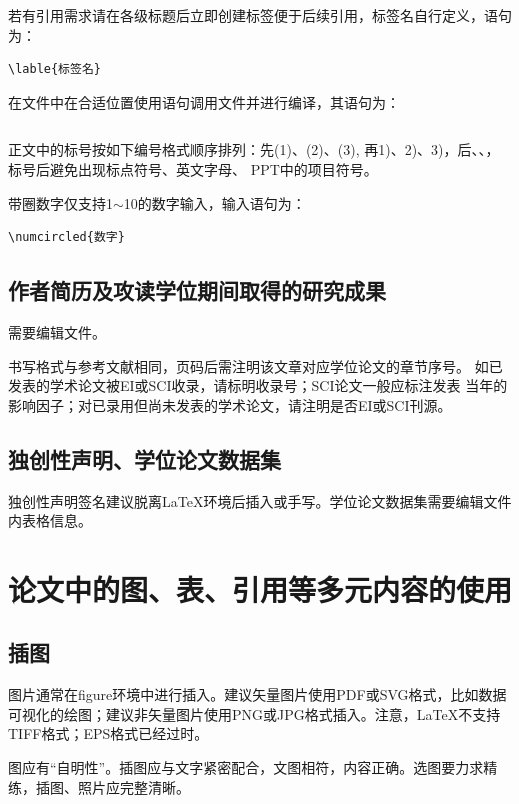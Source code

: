 若有引用需求请在各级标题后立即创建标签便于后续引用，标签名自行定义，语句为：
\begin{lstlisting}[language={[LaTeX]TeX}]
\lable{标签名}
\end{lstlisting}


在文件中在合适位置使用语句调用文件并进行编译，其语句为：
\begin{lstlisting}[language={[LaTeX]TeX}]

\end{lstlisting}

正文中的标号按如下编号格式顺序排列：先(1)、(2)、(3), 再1)、2)、3)，后、、，标号后避免出现标点符号、英文字母、 PPT中的项目符号。

带圈数字仅支持1$\sim$10的数字输入，输入语句为：
\begin{lstlisting}[language={[LaTeX]TeX}]
\numcircled{数字}
\end{lstlisting}

\subsection{作者简历及攻读学位期间取得的研究成果}
需要编辑文件。

书写格式与参考文献相同，页码后需注明该文章对应学位论文的章节序号。
如已发表的学术论文被EI或SCI收录，请标明收录号；SCI论文一般应标注发表
当年的影响因子；对已录用但尚未发表的学术论文，请注明是否EI或SCI刊源。

\subsection{独创性声明、学位论文数据集}
独创性声明签名建议脱离\LaTeX{}环境后插入或手写。学位论文数据集需要编辑文件内表格信息。

\section{论文中的图、表、引用等多元内容的使用}

\subsection{插图}
图片通常在figure环境中进行插入。建议矢量图片使用PDF或SVG格式，比如数据可视化的绘图；建议非矢量图片使用PNG或JPG格式插入。注意，\LaTeX{}不支持TIFF格式；EPS格式已经过时。

图应有“自明性”。插图应与文字紧密配合，文图相符，内容正确。选图要力求精练，插图、照片应完整清晰。

